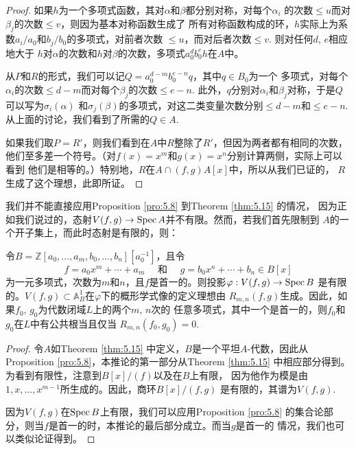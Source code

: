 \begin{proof}
如果$h$为一个多项式函数，其对$\alpha$和$\beta$都分别对称，对每个$\alpha_i$
的次数$\leq u$而对$\beta_j$的次数$\leq v$，则因为基本对称函数生成了
所有对称函数构成的环，$h$实际上为系数$a_i/a_0$和$b_j/b_0$的多项式，对前者次数
$\leq u$，而对后者次数$\leq v$. 则对任何$d$, $e$相应地大于
$h$对$\alpha$的次数和$h$对$\beta$的次数，多项式$a_0^db_0^e h$在$A$中。

从$P$和$R$的形式，我们可以记$Q=a_0^{d-m} b_0^{e-n} q$，其中$q\in B_0$为一个
多项式，对每个$\alpha_i$的次数$\leq d-m$而对每个$\beta_j$的次数$\leq e-n$. 
此外，$q$分别对$\alpha_i$和$\beta_j$对称，于是$Q$可以写为$\sigma_i(\alpha)$
和$\sigma_j(\beta)$的多项式，对这二类变量次数分别$\leq d-m$和$\leq e-n$.
从上面的讨论，我们看到了所需的$Q\in A$.

如果我们取$P=R'$，则我们看到在$A$中$R$整除了$R'$，但因为两者都有相同的次数，
他们至多差一个符号。（对$f(x)=x^m$和$g(x)=x^n$分别计算两侧，实际上可以看到
他们是相等的。）特别地，$R$在$A \cap(f, g) A[x]$中，所以从我们已证的，
$R$生成了这个理想，此即所证。
\end{proof}

我们并不能直接应用Proposition \ref{pro:5.8} 到Theorem \ref{thm:5.15} 的情况，
因为正如我们说过的，态射$V(f,g)\to \operatorname{Spec} A$并不有限。然而，若我们首先限制到
$A$的一个开子集上，而此时态射是有限的，则：

\begin{coro}\label{coro:5.16}
令$B=\mathbb{Z}[a_0, \ldots, a_m, b_0, \ldots, b_n][a_0^{-1}]$，且令
\[
    f=a_0 x^m+\cdots+a_m \quad \text { 和 } \quad g=b_0 x^n+\cdots+b_n \in B[x]
\]
为一元多项式，次数为$m$和$n$，且$f$是首一的。则投影$\varphi:V(f,g)\to \operatorname{Spec} B$
是有限的。$V(f,g)\subset \mathbb A_B^1$在$\varphi$下的概形学式像的定义理想由
$R_{m,n}(f,g)$生成。因此，如果$f_0$, $g_0$为代数闭域$L$上的两个$m$, $n$次的
任意多项式，其中一个是首一的，则$f_0$和$g_0$在$L$中有公共根当且仅当
$R_{m,n}(f_0,g_0)=0$.
\end{coro}

\begin{proof}
    令$A$如Theorem \ref{thm:5.15} 中定义，$B$是一个平坦$A$-代数，因此从
    Proposition \ref{pro:5.8}，本推论的第一部分从Theorem \ref{thm:5.15}
    中相应部分得到。为看到有限性，注意到$B[x]/(f)$以及在$B$上有限，
    因为他作为模是由$1,x,\dots,x^{m-1}$所生成的。因此，商环$B[x]/(f,g)$
    是有限的，其谱为$V(f,g)$.

    因为$V(f,g)$在$\operatorname{Spec} B$上有限，我们可以应用Proposition \ref{pro:5.8}
    的集合论部分，则当$f$是首一的时，本推论的最后部分成立。而当$g$是首一的
    情况，我们也可以类似论证得到。
\end{proof}

